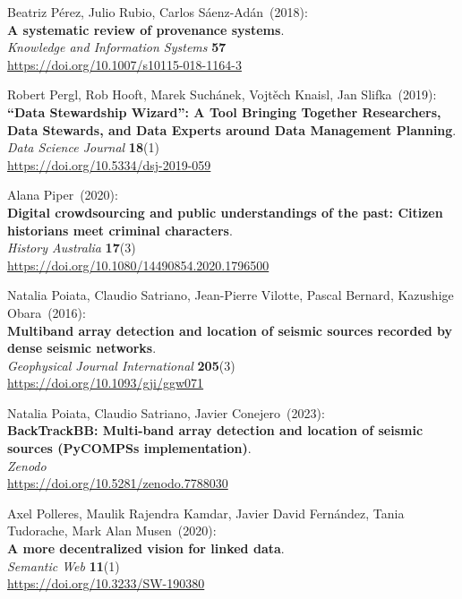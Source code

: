 \begin{thebibliography}{9}
Beatriz Pérez, Julio Rubio, Carlos Sáenz-Adán~(2018): \\
\textbf{A systematic review of provenance systems}.\\
\emph{Knowledge and Information Systems} \textbf{57}\\
\url{https://doi.org/10.1007/s10115-018-1164-3} 

Robert Pergl, Rob Hooft, Marek Suchánek, Vojtěch
Knaisl, Jan Slifka~(2019): \\
\textbf{``Data Stewardship Wizard'': A Tool Bringing Together
Researchers, Data Stewards, and Data Experts around Data Management
Planning}.\\
\emph{Data Science Journal} \textbf{18}(1)\\
\url{https://doi.org/10.5334/dsj-2019-059}

Alana Piper~(2020): \\
\textbf{Digital crowdsourcing and public understandings of the past:
Citizen historians meet criminal characters}.\\
\emph{History Australia} \textbf{17}(3) \\
\url{https://doi.org/10.1080/14490854.2020.1796500}

Natalia Poiata, Claudio Satriano, Jean-Pierre Vilotte, Pascal Bernard, Kazushige Obara~(2016): \\
\textbf{Multiband array detection and location of seismic sources recorded by dense seismic networks}.\\
\emph{Geophysical Journal International} \textbf{205}(3)\\
\url{https://doi.org/10.1093/gji/ggw071}

Natalia Poiata, Claudio Satriano, Javier Conejero~(2023): \\
\textbf{BackTrackBB: Multi-band array detection and location of seismic sources (PyCOMPSs implementation)}.\\
\emph{Zenodo}\\
\url{https://doi.org/10.5281/zenodo.7788030}


Axel Polleres, Maulik Rajendra Kamdar, Javier David Fernández, Tania
Tudorache, Mark Alan Musen~(2020): \\
\textbf{A more decentralized vision for linked data}.\\ 
\emph{Semantic Web} \textbf{11}(1) \\
\url{https://doi.org/10.3233/SW-190380}


\end{thebibliography}
